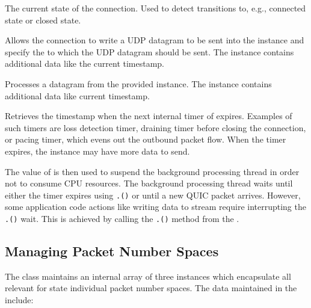 \begin{description}

   The current state of the
connection. Used to detect transitions to, e.g., connected state or closed state.

   Allows the connection to write a UDP datagram to be sent into
the \QuicWriter{} instance and specify the  to which the UDP datagram should be
sent. The  instance contains additional data like the current timestamp.

   Processes a datagram from the provided \QuicReader{}
instance. The  instance contains additional data like current
timestamp.

   Retrieves the timestamp when the next
internal timer of expires. Examples of such timers are loss detection timer, draining timer before
closing the connection, or pacing timer, which evens out the outbound packet flow. When the timer
expires, the \ManagedQuicConnection{} instance may have more data to send.

\end{description}

The value of  is then used to suspend the background processing thread
in order not to consume CPU resources. The background processing thread waits until either the timer
expires using \texttt{.()} or until a new QUIC packet arrives. However,
some application code actions like writing data to stream require interrupting the
\texttt{.()} wait. This is achieved by calling the
\texttt{\QuicConnectionContext{}.()} method from the \ManagedQuicConnection{}.

\subsection{Managing Packet Number Spaces}

The \ManagedQuicConnection{} class maintains an internal array of three \PacketNumberSpace{}
instances which encapsulate all relevant for state individual packet number spaces. The data
maintained in the \PacketNumberSpace{} include:


